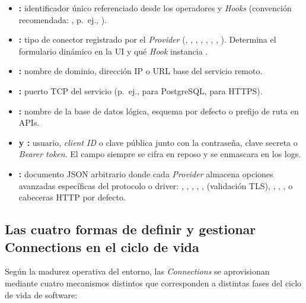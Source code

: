 \begin{itemize}
  \item \textbf{:} identificador único referenciado desde los operadores y \textit{Hooks} (convención recomendada: , p.~ej., ).
  \item \textbf{:} tipo de conector registrado por el \textit{Provider} (, , , , , , , ). Determina el formulario dinámico en la UI y qué \textit{Hook} instancia .
  \item \textbf{:} nombre de dominio, dirección IP o URL base del servicio remoto.
  \item \textbf{:} puerto TCP del servicio (p.~ej.,  para PostgreSQL,  para HTTPS).
  \item \textbf{:} nombre de la base de datos lógica, esquema por defecto o prefijo de ruta en APIs.
  \item \textbf{ y :} usuario, \textit{client ID} o clave pública junto con la contraseña, clave secreta o \textit{Bearer token}. El campo  siempre se cifra en reposo y se enmascara en los logs.
  \item \textbf{:} documento JSON arbitrario donde cada \textit{Provider} almacena opciones avanzadas específicas del protocolo o driver: , , , , ,  (validación TLS), , , ,  o cabeceras HTTP por defecto.
\end{itemize}

\subsection{Las cuatro formas de definir y gestionar Connections en el ciclo de vida}

Según la madurez operativa del entorno, las \textit{Connections} se aprovisionan mediante cuatro mecanismos distintos que corresponden a distintas fases del ciclo de vida de software:

